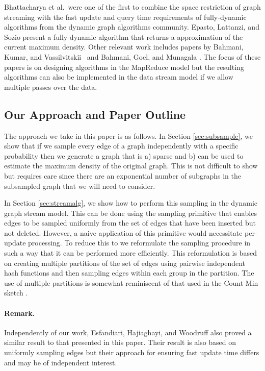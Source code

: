 \documentclass[11pt]{article}
\begin{document}
Bhattacharya et al.~were one of the first to combine the space restriction of graph streaming with the fast update and query time requirements of fully-dynamic algorithms from the dynamic graph algorithms community. 
Epasto, Lattanzi, and Sozio \cite{EpastoLS15} present a fully-dynamic algorithm that returns a  approximation of the current maximum density.
Other relevant work includes papers by Bahmani, Kumar, and Vassilvitskii~\cite{BahmaniKV12} and Bahmani, Goel, and  Munagala \cite{BahmaniGM14}. The focus of these papers is on designing algorithms in the MapReduce model but the resulting algorithms can also be implemented in the data stream model if we allow multiple passes over the data.




\subsection{Our Approach and Paper Outline}

The approach we take in this paper is as follows. In Section \ref{sec:subsample}, we show that if we sample every edge of a graph independently with a specific probability then we generate a graph that is a) sparse and b) can be used to estimate the maximum density of the original graph. This is not difficult to show but requires care since there are an exponential number of subgraphs in the subsampled graph that we will need to consider.

In Section \ref{sec:streamalg}, we show how to perform this sampling in the dynamic graph stream model. This can be done using the  sampling primitive \cite{JowhariST11,CormodeF14} that enables edges to be sampled uniformly from the set of edges that have been inserted but not deleted. However, a naive application of this primitive would necessitate  per-update processing. To reduce this to  we reformulate the sampling procedure in such a way that it can be performed more efficiently. This reformulation is based on creating multiple partitions of the set of edges using pairwise independent hash functions and then sampling edges within each group in the partition. The use of multiple partitions is somewhat reminiscent of that used in the Count-Min sketch \cite{CormodeM05}.

\paragraph{Remark.} Independently of our work,  Esfandiari, Hajiaghayi, and Woodruff \cite{EsfandiariHW15}  also proved a similar result to that presented in this paper. Their result is also based on uniformly sampling edges but their approach for ensuring fast update time differs and may be of independent interest.
\end{document}
